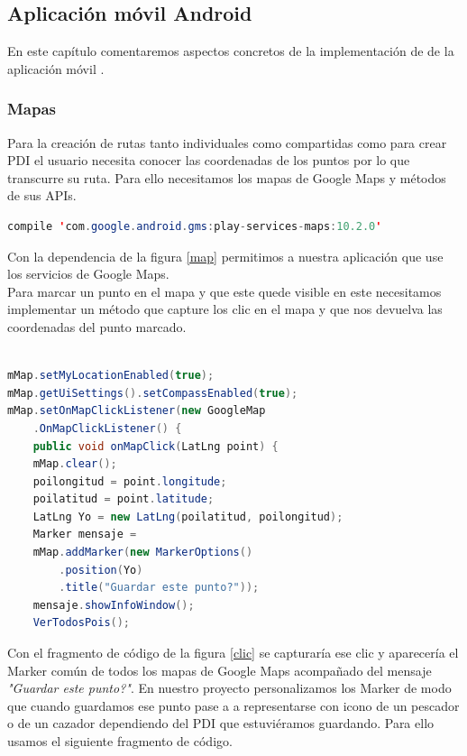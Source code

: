 \newpage

 
 
 
 
 \subsection{Aplicación móvil Android}
En este capítulo comentaremos aspectos concretos de la implementación de de la aplicación móvil \cite{8}.



\subsubsection{Mapas}

 Para la creación de rutas tanto individuales como compartidas como para crear PDI el usuario necesita conocer las coordenadas de los puntos por lo que transcurre su ruta. Para ello necesitamos los mapas de Google Maps y métodos de sus APIs.
 
 
 \begin{lstlisting}[language=java,caption={Dependencia de Google Maps en gradle},label=map]
compile 'com.google.android.gms:play-services-maps:10.2.0'

\end{lstlisting}
 
 Con la dependencia de la figura \ref{map} permitimos a nuestra aplicación que use los servicios de  Google Maps.\\
 Para marcar un punto en el mapa y que este quede visible en este necesitamos implementar un método que capture los clic en el mapa y que nos devuelva las coordenadas del punto marcado.
 
 
 \begin{lstlisting}[language=java,caption={Captura de clic en la pantalla},label=clic]
    
mMap.setMyLocationEnabled(true);
mMap.getUiSettings().setCompassEnabled(true);
mMap.setOnMapClickListener(new GoogleMap
	.OnMapClickListener() {
	public void onMapClick(LatLng point) {
	mMap.clear();
	poilongitud = point.longitude;
	poilatitud = point.latitude;
	LatLng Yo = new LatLng(poilatitud, poilongitud);
	Marker mensaje = 
	mMap.addMarker(new MarkerOptions()
		.position(Yo)
		.title("Guardar este punto?"));
  	mensaje.showInfoWindow();
	VerTodosPois();

\end{lstlisting} 
 
 
 
 
  Con el fragmento de código de la figura \ref{clic}  se capturaría ese clic y aparecería el Marker común de todos los mapas de Google Maps acompañado del mensaje \textit{"Guardar este punto?"}. En nuestro proyecto personalizamos los Marker de modo que cuando guardamos ese punto pase a a representarse con icono de un pescador o de un cazador dependiendo del PDI que estuviéramos guardando. Para ello usamos el siguiente fragmento de código.

